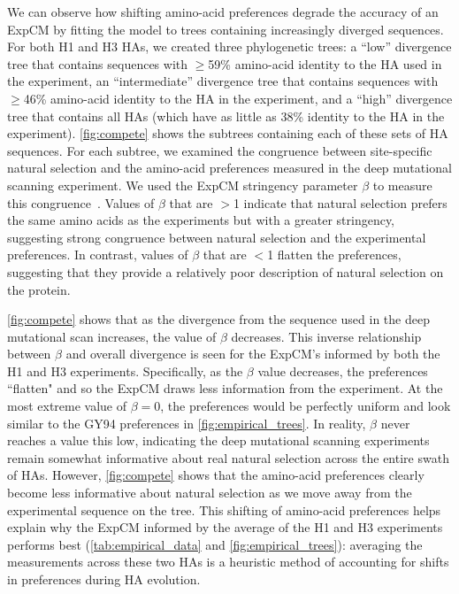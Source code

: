 \documentclass[11pt]{article}
\begin{document}
We can observe how shifting amino-acid preferences degrade the accuracy of an ExpCM by fitting the model to trees containing increasingly diverged sequences.
For both H1 and H3 HAs, we created three phylogenetic trees: a ``low'' divergence tree that contains sequences with $\ge$59\% amino-acid identity to the HA used in the experiment, an ``intermediate'' divergence tree that contains sequences with $\ge$46\% amino-acid identity to the HA in the experiment, and a ``high'' divergence tree that contains all HAs (which have as little as 38\% identity to the HA in the experiment).
\ref{fig:compete} shows the subtrees containing each of these sets of HA sequences.
For each subtree, we examined the congruence between site-specific natural selection and the amino-acid preferences measured in the deep mutational scanning experiment. 
We used the ExpCM stringency parameter $\beta$ to measure this congruence~\citep{bloom2014informed,hilton2017phydms}. 
Values of $\beta$ that are $>$1 indicate that natural selection prefers the same amino acids as the experiments but with a greater stringency, suggesting strong congruence between natural selection and the experimental preferences. 
In contrast, values of $\beta$ that are $<$1 flatten the preferences, suggesting that they provide a relatively poor description of natural selection on the protein.

\ref{fig:compete} shows that as the divergence from the sequence used in the deep mutational scan increases, the value of $\beta$ decreases. 
This inverse relationship between $\beta$ and overall divergence is seen for the ExpCM's informed by both the H1 and H3 experiments.
Specifically, as the $\beta$ value decreases, the preferences ``flatten" and so the ExpCM draws less information from the experiment. 
At the most extreme value of $\beta = 0$, the preferences would be perfectly uniform and look similar to the GY94 preferences in \ref{fig:empirical_trees}.
In reality, $\beta$ never reaches a value this low, indicating the deep mutational scanning experiments remain somewhat informative about real natural selection across the entire swath of HAs. 
However, \ref{fig:compete} shows that the amino-acid preferences clearly become less informative about natural selection as we move away from the experimental sequence on the tree.
This shifting of amino-acid preferences helps explain why the ExpCM informed by the average of the H1 and H3 experiments performs best (\ref{tab:empirical_data} and \ref{fig:empirical_trees}): averaging the measurements across these two HAs is a heuristic method of accounting for shifts in preferences during HA evolution. 
 
\end{document}
